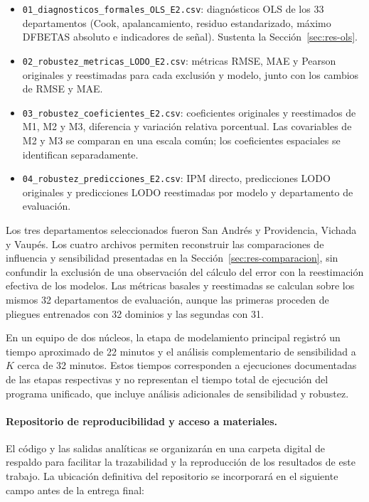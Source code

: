 \begin{itemize}
    \item \texttt{01\_diagnosticos\_formales\_\allowbreak OLS\_E2.csv}: diagnósticos OLS de los 33 departamentos (Cook, apalancamiento, residuo estandarizado, máximo DFBETAS absoluto e indicadores de señal). Sustenta la Sección~\ref{sec:res-ols}.
    \item \texttt{02\_robustez\_metricas\_\allowbreak LODO\_E2.csv}: métricas RMSE, MAE y Pearson originales y reestimadas para cada exclusión y modelo, junto con los cambios de RMSE y MAE.
    \item \texttt{03\_robustez\_\allowbreak coeficientes\_E2.csv}: coeficientes originales y reestimados de M1, M2 y M3, diferencia y variación relativa porcentual. Las covariables de M2 y M3 se comparan en una escala común; los coeficientes espaciales se identifican separadamente.
    \item \texttt{04\_robustez\_\allowbreak predicciones\_E2.csv}: IPM directo, predicciones LODO originales y predicciones LODO reestimadas por modelo y departamento de evaluación.
\end{itemize}

Los tres departamentos seleccionados fueron San Andrés y Providencia, Vichada y Vaupés. Los cuatro archivos permiten reconstruir las comparaciones de influencia y sensibilidad presentadas en la Sección~\ref{sec:res-comparacion}, sin confundir la exclusión de una observación del cálculo del error con la reestimación efectiva de los modelos. Las métricas basales y reestimadas se calculan sobre los mismos 32 departamentos de evaluación, aunque las primeras proceden de pliegues entrenados con 32 dominios y las segundas con 31.

En un equipo de dos núcleos, la etapa de modelamiento principal registró un tiempo aproximado de 22 minutos y el análisis complementario de sensibilidad a $K$ cerca de 32 minutos. Estos tiempos corresponden a ejecuciones documentadas de las etapas respectivas y no representan el tiempo total de ejecución del programa unificado, que incluye análisis adicionales de sensibilidad y robustez.

\paragraph{Repositorio de reproducibilidad y acceso a materiales.}

El código y las salidas analíticas se organizarán en una carpeta digital de respaldo para facilitar la trazabilidad y la reproducción de los resultados de este trabajo. La ubicación definitiva del repositorio se incorporará en el siguiente campo antes de la entrega final:

